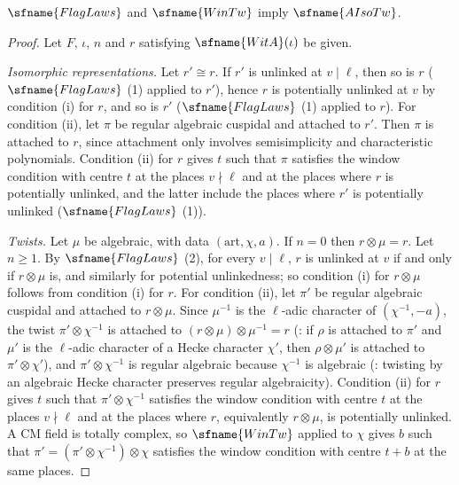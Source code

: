 \begin{proposition}\label{pf:modularity:aisotw}
$\sfname{FlagLaws}$ and $\sfname{WinTw}$ imply $\sfname{AIsoTw}$.
\end{proposition}

\begin{proof}
Let $F$, $\iota$, $n$ and $r$ satisfying $\sfname{WitA}(\iota)$ be given.

\emph{Isomorphic representations.} Let $r'\cong r$. If $r'$ is unlinked at $v\mid\ell$, then so is $r$ ($\sfname{FlagLaws}$
(1) applied to $r'$), hence $r$ is potentially unlinked at $v$ by condition (i) for $r$, and so is $r'$ ($\sfname{FlagLaws}$
(1) applied to $r$). For condition (ii), let $\pi$ be regular algebraic cuspidal and attached to $r'$. Then $\pi$ is
attached to $r$, since attachment only involves semisimplicity and characteristic polynomials. Condition (ii) for $r$ gives
$t$ such that $\pi$ satisfies the window condition with centre $t$ at the places $v\nmid\ell$ and at the places where $r$ is
potentially unlinked, and the latter include the places where $r'$ is potentially unlinked ($\sfname{FlagLaws}$ (1)).

\emph{Twists.} Let $\mu$ be algebraic, with data $(\mathrm{art},\chi,a)$. If $n=0$ then $r\otimes\mu=r$. Let $n\ge1$. By
$\sfname{FlagLaws}$ (2), for every $v\mid\ell$, $r$ is unlinked at $v$ if and only if $r\otimes\mu$ is, and similarly for
potential unlinkedness; so condition (i) for $r\otimes\mu$ follows from condition (i) for $r$. For condition (ii), let
$\pi'$ be regular algebraic cuspidal and attached to $r\otimes\mu$. Since $\mu^{-1}$ is the $\ell$-adic character of
$(\chi^{-1},-a)$, the twist $\pi'\otimes\chi^{-1}$ is attached to $(r\otimes\mu)\otimes\mu^{-1}=r$
(: if $\rho$ is attached to $\pi'$ and $\mu'$ is the $\ell$-adic character of a
Hecke character $\chi'$, then $\rho\otimes\mu'$ is attached to $\pi'\otimes\chi'$), and $\pi'\otimes\chi^{-1}$ is regular
algebraic because $\chi^{-1}$ is algebraic (: twisting by an algebraic Hecke
character preserves regular algebraicity). Condition (ii) for $r$ gives $t$ such that $\pi'\otimes\chi^{-1}$ satisfies the
window condition with centre $t$ at the places $v\nmid\ell$ and at the places where $r$, equivalently $r\otimes\mu$, is
potentially unlinked. A CM field is totally complex, so $\sfname{WinTw}$ applied to $\chi$ gives $b$ such that
$\pi'=(\pi'\otimes\chi^{-1})\otimes\chi$ satisfies the window condition with centre $t+b$ at the same places.
\end{proof}

